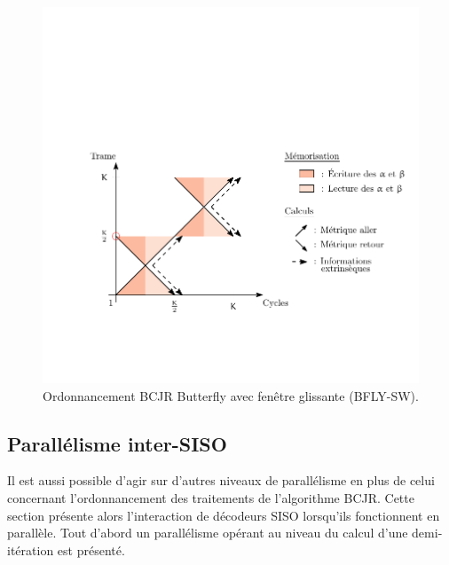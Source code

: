 \begin{figure}[!h]
	\centering
	\includegraphics{main/ch4_fig/ipe/BFLY_SW+LEG.pdf}
	\caption{Ordonnancement BCJR Butterfly avec fenêtre glissante (BFLY-SW). \label{fig:siso_bf_sw}}
	\vspace*{-1ex}
\end{figure}


\subsection{Parallélisme inter-SISO}
Il est aussi possible d'agir sur d'autres niveaux de parallélisme en plus de celui concernant l'ordonnancement des traitements
de l'algorithme BCJR. Cette section présente alors l’interaction de décodeurs SISO lorsqu'ils fonctionnent en parallèle. 
Tout d'abord un parallélisme opérant au niveau du calcul d'une demi-itération est présenté.
